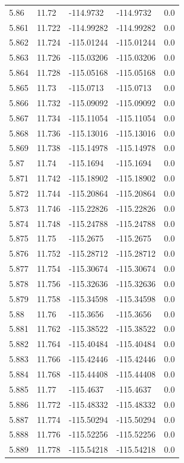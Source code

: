 \begin{tabular}{lllll}
5.86 & 11.72 & -114.9732 & -114.9732 & 0.0 \\
5.861 & 11.722 & -114.99282 & -114.99282 & 0.0 \\
5.862 & 11.724 & -115.01244 & -115.01244 & 0.0 \\
5.863 & 11.726 & -115.03206 & -115.03206 & 0.0 \\
5.864 & 11.728 & -115.05168 & -115.05168 & 0.0 \\
5.865 & 11.73 & -115.0713 & -115.0713 & 0.0 \\
5.866 & 11.732 & -115.09092 & -115.09092 & 0.0 \\
5.867 & 11.734 & -115.11054 & -115.11054 & 0.0 \\
5.868 & 11.736 & -115.13016 & -115.13016 & 0.0 \\
5.869 & 11.738 & -115.14978 & -115.14978 & 0.0 \\
5.87 & 11.74 & -115.1694 & -115.1694 & 0.0 \\
5.871 & 11.742 & -115.18902 & -115.18902 & 0.0 \\
5.872 & 11.744 & -115.20864 & -115.20864 & 0.0 \\
5.873 & 11.746 & -115.22826 & -115.22826 & 0.0 \\
5.874 & 11.748 & -115.24788 & -115.24788 & 0.0 \\
5.875 & 11.75 & -115.2675 & -115.2675 & 0.0 \\
5.876 & 11.752 & -115.28712 & -115.28712 & 0.0 \\
5.877 & 11.754 & -115.30674 & -115.30674 & 0.0 \\
5.878 & 11.756 & -115.32636 & -115.32636 & 0.0 \\
5.879 & 11.758 & -115.34598 & -115.34598 & 0.0 \\
5.88 & 11.76 & -115.3656 & -115.3656 & 0.0 \\
5.881 & 11.762 & -115.38522 & -115.38522 & 0.0 \\
5.882 & 11.764 & -115.40484 & -115.40484 & 0.0 \\
5.883 & 11.766 & -115.42446 & -115.42446 & 0.0 \\
5.884 & 11.768 & -115.44408 & -115.44408 & 0.0 \\
5.885 & 11.77 & -115.4637 & -115.4637 & 0.0 \\
5.886 & 11.772 & -115.48332 & -115.48332 & 0.0 \\
5.887 & 11.774 & -115.50294 & -115.50294 & 0.0 \\
5.888 & 11.776 & -115.52256 & -115.52256 & 0.0 \\
5.889 & 11.778 & -115.54218 & -115.54218 & 0.0 \\

\end{tabular}
